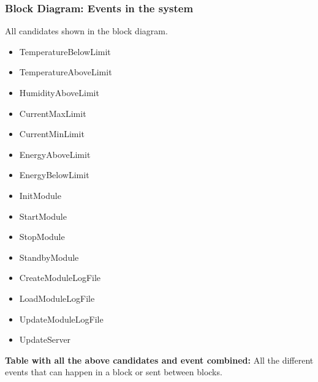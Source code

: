 \subsubsection{Block Diagram: Events in the system}
All candidates shown in the block diagram.
	\begin{itemize}
		\item TemperatureBelowLimit
		\item TemperatureAboveLimit
		\item HumidityAboveLimit
		\item CurrentMaxLimit
		\item CurrentMinLimit
		\item EnergyAboveLimit
		\item EnergyBelowLimit
		\item InitModule
		\item StartModule
		\item StopModule
		\item StandbyModule
		\item CreateModuleLogFile
		\item LoadModuleLogFile
		\item UpdateModuleLogFile
		\item UpdateServer
	\end{itemize}
\textbf{Table with all the above candidates and event combined:}
All the different events that can happen in a block or sent between blocks. 
